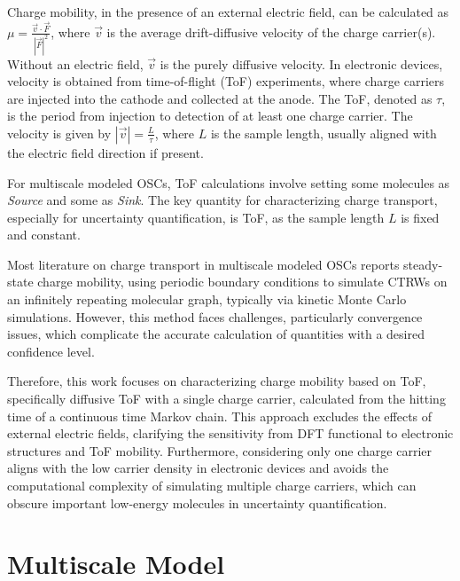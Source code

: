 \documentclass[letterpaper,12pt]{article}
\begin{document}
Charge mobility, in the presence of an external electric field, can be calculated as $\mu = \frac{\vec{v} \cdot \vec{F}}{|\vec{F}|^2}$, where $\vec{v}$ is the average drift-diffusive velocity of the charge carrier(s). Without an electric field, $\vec{v}$ is the purely diffusive velocity. In electronic devices, velocity is obtained from time-of-flight (ToF) experiments, where charge carriers are injected into the cathode and collected at the anode. The ToF, denoted as $\tau$, is the period from injection to detection of at least one charge carrier. The velocity is given by $|\vec{v}| = \frac{L}{\tau}$, where $L$ is the sample length, usually aligned with the electric field direction if present.

For multiscale modeled OSCs, ToF calculations involve setting some molecules as \textit{Source} and some as \textit{Sink}. The key quantity for characterizing charge transport, especially for uncertainty quantification, is ToF, as the sample length $L$ is fixed and constant.

Most literature on charge transport in multiscale modeled OSCs reports steady-state charge mobility, using periodic boundary conditions to simulate CTRWs on an infinitely repeating molecular graph, typically via kinetic Monte Carlo simulations. However, this method faces challenges, particularly convergence issues, which complicate the accurate calculation of quantities with a desired confidence level.

Therefore, this work focuses on characterizing charge mobility based on ToF, specifically diffusive ToF with a single charge carrier, calculated from the hitting time of a continuous time Markov chain. This approach excludes the effects of external electric fields, clarifying the sensitivity from DFT functional to electronic structures and ToF mobility. 
Furthermore, considering only one charge carrier aligns with the low carrier density in electronic devices and avoids the computational complexity of simulating multiple charge carriers, which can obscure important low-energy molecules in uncertainty quantification.

\section{Multiscale Model}
\label{sec:MSM}
\end{document}
